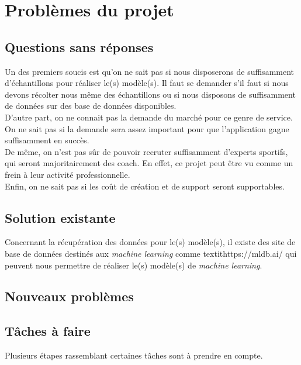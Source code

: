 
\chapter{Problèmes du projet}

\section{Questions sans réponses}

Un des premiers soucis est qu'on ne sait pas si nous disposerons de suffisamment d'échantillons pour réaliser le(s) modèle(s). Il faut se demander s'il faut si nous devons récolter nous même des échantillons ou si nous disposons de suffisamment de données sur des base de données disponibles.\\

D'autre part, on ne connait pas la demande du marché pour ce genre de service. On ne sait pas si la demande sera assez important pour que l'application gagne suffisamment en succès.\\

De même, on n'est pas sûr de pouvoir recruter suffisamment d'experts sportifs, qui seront majoritairement des coach. En effet, ce projet peut être vu comme un frein à leur activité professionnelle.\\ 

Enfin, on ne sait pas si les coût de création et de support seront supportables.  

\section{Solution existante}

Concernant la récupération des données pour le(s) modèle(s), il existe des site de base de données destinés aux \textit{machine learning} comme textit{https://mldb.ai/} qui peuvent nous permettre de réaliser le(s) modèle(s) de \textit{machine learning}.

\section{Nouveaux problèmes}

\section{Tâches à faire}

Plusieurs étapes rassemblant certaines tâches sont à prendre en compte. 

